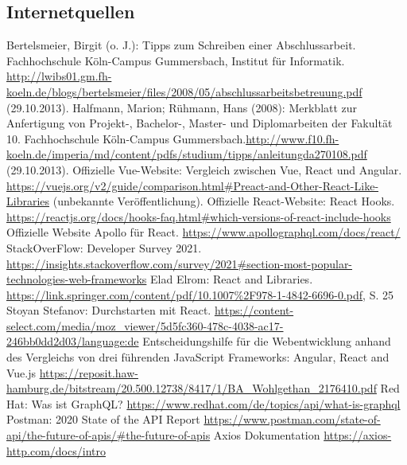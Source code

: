      \subsection{Internetquellen}
     \begin{thebibliography}{HR08} %
       Bertelsmeier, Birgit (o. J.): Tipps zum Schrei\-b\-en ei\-n\-er Ab\-sch\-luss\-ar\-beit. Fach\-hoch\-schu\-le Köln-Campus Gummersbach, Institut für Informatik. \url{http://lwibs01.gm.fh-koeln.de/blogs/bertelsmeier/files/2008/05/abschlussarbeitsbetreuung.pdf} (29.10.2013).
         Halfmann, Marion; Rühmann, Hans (2008): Merkblatt zur Anfertigung von Projekt-, Bachelor-, Master- und Diplomarbeiten der Fakultät 10. Fachhochschule Köln-Campus Gummersbach.\url{http://www.f10.fh-koeln.de/imperia/md/content/pdfs/studium/tipps/anleitungda270108.pdf} (29.10.2013).
         Offizielle Vue-Website: Vergleich zwischen Vue, React und Angular. \url{https://vuejs.org/v2/guide/comparison.html#Preact-and-Other-React-Like-Libraries} (unbekannte Veröffentlichung).
        Offizielle React-Website: React Hooks. \url{https://reactjs.org/docs/hooks-faq.html#which-versions-of-react-include-hooks}
        Offizielle Website Apollo für React. \url{https://www.apollographql.com/docs/react/}
        StackOverFlow: Developer Survey 2021. \url{https://insights.stackoverflow.com/survey/2021#section-most-popular-technologies-web-frameworks}
        Elad Elrom: React and Libraries. \url{https://link.springer.com/content/pdf/10.1007%2F978-1-4842-6696-0.pdf}, S. 25
        Stoyan Stefanov: Durchstarten mit React. \url{https://content-select.com/media/moz_viewer/5d5fc360-478c-4038-ac17-246bb0dd2d03/language:de}
        Entscheidungshilfe für die Webentwicklung anhand des Vergleichs von drei führenden JavaScript Frameworks: Angular, React and Vue.js \url{https://reposit.haw-hamburg.de/bitstream/20.500.12738/8417/1/BA_Wohlgethan_2176410.pdf}
        Red Hat: Was ist GraphQL? \url{https://www.redhat.com/de/topics/api/what-is-graphql}
        Postman: 2020 State of the API Report \url{https://www.postman.com/state-of-api/the-future-of-apis/#the-future-of-apis}
        Axios Dokumentation \url{https://axios-http.com/docs/intro}



\end{thebibliography}
